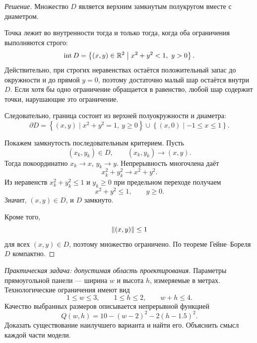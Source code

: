 \begin{proof}[Решение]
Множество \(D\) является верхним замкнутым полукругом вместе с диаметром.

Точка лежит во внутренности тогда и только тогда, когда оба ограничения выполняются строго:
\[
\operatorname{int}D
=
\left\{(x,y)\in\mathbb{R}^2
\;\middle|\;
 x^2+y^2<1,
\ y>0
\right\}.
\]
Действительно, при строгих неравенствах остаётся положительный запас до окружности и до прямой \(y=0\), поэтому достаточно малый шар остаётся внутри \(D\). Если хотя бы одно ограничение обращается в равенство, любой шар содержит точки, нарушающие это ограничение.

Следовательно, граница состоит из верхней полуокружности и диаметра:
\[
\partial D
=
\left\{(x,y)\mid x^2+y^2=1,\ y\geq0\right\}
\cup
\left\{(x,0)\mid -1\leq x\leq1\right\}.
\]

Покажем замкнутость последовательным критерием. Пусть
\[
(x_k,y_k)\in D,
\qquad
(x_k,y_k)\to(x,y).
\]
Тогда покоординатно \(x_k\to x\), \(y_k\to y\). Непрерывность многочлена даёт
\[
x_k^2+y_k^2\to x^2+y^2.
\]
Из неравенств \(x_k^2+y_k^2\leq1\) и \(y_k\geq0\) при предельном переходе получаем
\[
x^2+y^2\leq1,
\qquad
y\geq0.
\]
Значит, \((x,y)\in D\), и \(D\) замкнуто.

Кроме того,
\[
\lVert(x,y)\rVert\leq1
\]
для всех \((x,y)\in D\), поэтому множество ограничено. По теореме Гейне--Бореля \(D\) компактно.
\end{proof}

\begin{problem}
\textit{Практическая задача: допустимая область проектирования.}
Параметры прямоугольной панели --- ширина \(w\) и высота \(h\), измеряемые в метрах. Технологические ограничения имеют вид
\[
1\leq w\leq3,
\qquad
1\leq h\leq2,
\qquad
w+h\leq4.
\]
Качество выбранных размеров описывается непрерывной функцией
\[
Q(w,h)
=
10-(w-2)^2-2(h-1.5)^2.
\]
Доказать существование наилучшего варианта и найти его. Объяснить смысл каждой части модели.
\end{problem}

